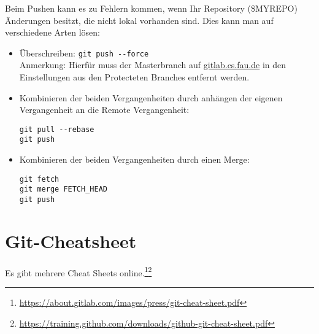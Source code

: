 \documentclass[10pt,a4paper]{article}
\begin{document}
Beim Pushen kann es zu Fehlern kommen, wenn Ihr Repository (\$MYREPO) Änderungen besitzt, die nicht lokal vorhanden sind.
Dies kann man auf verschiedene Arten lösen:
\begin{itemize}
\item Überschreiben: \lstinline|git push --force|\\
Anmerkung: Hierfür muss der Masterbranch auf \url{gitlab.cs.fau.de} in den Einstellungen aus den Protecteten Branches entfernt werden.
\item Kombinieren der beiden Vergangenheiten durch anhängen der eigenen Vergangenheit an die Remote Vergangenheit: 
\begin{lstlisting}
git pull --rebase
git push
\end{lstlisting}
\item Kombinieren der beiden Vergangenheiten durch einen Merge:
\begin{lstlisting}
git fetch
git merge FETCH_HEAD
git push
\end{lstlisting}
\end{itemize}
\section{Git-Cheatsheet}
Es gibt mehrere Cheat Sheets online.\footnote{\url{https://about.gitlab.com/images/press/git-cheat-sheet.pdf}}\footnote{\url{https://training.github.com/downloads/github-git-cheat-sheet.pdf}}
\end{document}
